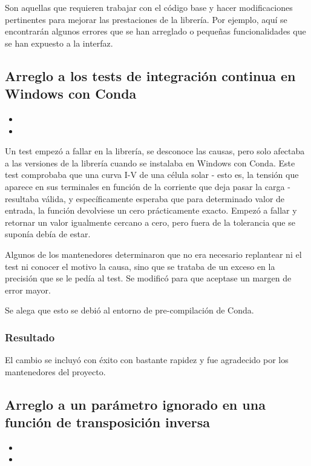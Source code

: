 Son aquellas que requieren trabajar con el código base y hacer modificaciones pertinentes para mejorar las prestaciones de la librería. Por ejemplo, aquí se encontrarán algunos errores que se han arreglado o pequeñas funcionalidades que se han expuesto a la interfaz.

\subsection{Arreglo a los tests de integración continua en Windows con Conda}

\begin{itemize}
    \item {}
    \item {}
\end{itemize}

Un test empezó a fallar en la librería, se desconoce las causas, pero solo afectaba a las versiones de la librería cuando se instalaba en Windows con Conda. Este test comprobaba que una \gls{curva I-V} de una \gls{célula solar} - esto es, la tensión que aparece en sus terminales en función de la corriente que deja pasar la \gls{carga} - resultaba válida, y específicamente esperaba que para determinado valor de entrada, la función devolviese un cero prácticamente exacto. Empezó a fallar y retornar un valor igualmente cercano a cero, pero fuera de la tolerancia que se suponía debía de estar.

Algunos de los mantenedores determinaron que no era necesario replantear ni el test ni conocer el motivo la causa, sino que se trataba de un exceso en la precisión que se le pedía al test. Se modificó para que aceptase un margen de error mayor.

Se alega que esto se debió al entorno de pre-compilación de Conda.

\subsubsection{Resultado}

El cambio se incluyó con éxito con bastante rapidez y fue agradecido por los mantenedores del proyecto.

\subsection{Arreglo a un parámetro ignorado en una función de transposición inversa}

\begin{itemize}
    \item {}
    \item {}
\end{itemize}

